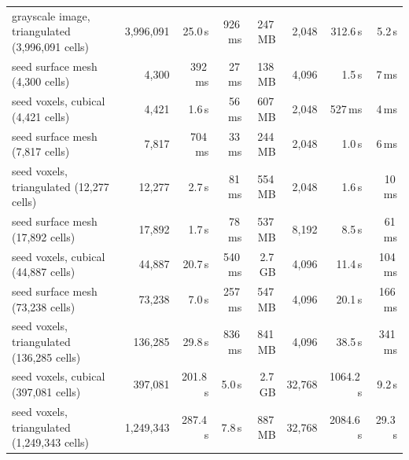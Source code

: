 \begin{tabular}{lrrrrrrr}
grayscale image, triangulated (3,996,091 cells) & 3,996,091 & 25.0\,s & 926\,ms & 247\,MB & 2,048 & 312.6\,s & 5.2\,s \\
seed surface mesh (4,300 cells) & 4,300 & 392\,ms & 27\,ms & 138\,MB & 4,096 & 1.5\,s & 7\,ms \\
seed voxels, cubical (4,421 cells) & 4,421 & 1.6\,s & 56\,ms & 607\,MB & 2,048 & 527\,ms & 4\,ms \\
seed surface mesh (7,817 cells) & 7,817 & 704\,ms & 33\,ms & 244\,MB & 2,048 & 1.0\,s & 6\,ms \\
seed voxels, triangulated (12,277 cells) & 12,277 & 2.7\,s & 81\,ms & 554\,MB & 2,048 & 1.6\,s & 10\,ms \\
seed surface mesh (17,892 cells) & 17,892 & 1.7\,s & 78\,ms & 537\,MB & 8,192 & 8.5\,s & 61\,ms \\
seed voxels, cubical (44,887 cells) & 44,887 & 20.7\,s & 540\,ms & 2.7\,GB & 4,096 & 11.4\,s & 104\,ms \\
seed surface mesh (73,238 cells) & 73,238 & 7.0\,s & 257\,ms & 547\,MB & 4,096 & 20.1\,s & 166\,ms \\
seed voxels, triangulated (136,285 cells) & 136,285 & 29.8\,s & 836\,ms & 841\,MB & 4,096 & 38.5\,s & 341\,ms \\
seed voxels, cubical (397,081 cells) & 397,081 & 201.8\,s & 5.0\,s & 2.7\,GB & 32,768 & 1064.2\,s & 9.2\,s \\
seed voxels, triangulated (1,249,343 cells) & 1,249,343 & 287.4\,s & 7.8\,s & 887\,MB & 32,768 & 2084.6\,s & 29.3\,s \\
\bottomrule
\end{tabular}

